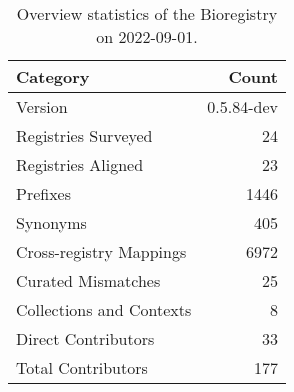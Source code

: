 \begin{table}
\centering
\caption{Overview statistics of the Bioregistry on 2022-09-01.}
\label{tab:bioregistry-summary}
\begin{tabular}{lr}
\toprule
                Category &      Count \\
\midrule
                 Version & 0.5.84-dev \\
     Registries Surveyed &         24 \\
      Registries Aligned &         23 \\
                Prefixes &       1446 \\
                Synonyms &        405 \\
 Cross-registry Mappings &       6972 \\
      Curated Mismatches &         25 \\
Collections and Contexts &          8 \\
     Direct Contributors &         33 \\
      Total Contributors &        177 \\
\bottomrule
\end{tabular}
\end{table}
